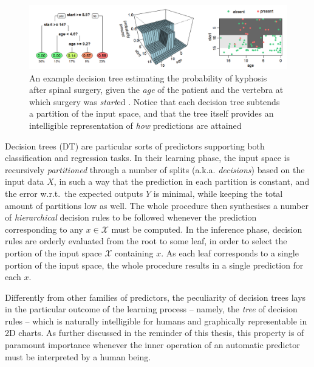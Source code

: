 \documentclass[12pt,a4paper,openright,twoside]{book}
\begin{document}
\begin{figure}
    \centering
    \includegraphics[width=\linewidth]{figures/dt-kyphosis.png}
    \caption[An example decision tree estimating the probability of kyphosis after spinal surgery]{An example decision tree estimating the probability of kyphosis after spinal surgery, given the \emph{age} of the patient and the vertebra at which surgery was \emph{start}ed \cite{wiki:dt-learning}. Notice that each decision tree subtends a partition of the input space, and that the tree itself provides an intelligible representation of \emph{how} predictions are attained}
    \label{fig:dt-example}
\end{figure}

Decision trees (DT) are particular sorts of predictors supporting both classification and regression tasks.
%
In their learning phase, the input space is recursively \emph{partitioned} through a number of splits (a.k.a. \emph{decisions}) based on the input data $X$, in such a way that the prediction in each partition is constant, and the error w.r.t.\ the expected outputs $Y$ is minimal, while keeping the total amount of partitions low as well.
%
The whole procedure then synthesises a number of \emph{hierarchical} decision rules to be followed whenever the prediction corresponding to any $x \in \mathcal{X}$ must be computed.
%
In the inference phase, decision rules are orderly evaluated from the root to some leaf, in order to select the portion of the input space  $\mathcal{X}$ containing $x$.
%
As each leaf corresponds to a single portion of the input space, the whole procedure results in a single prediction for each $x$.

Differently from other families of predictors, the peculiarity of decision trees lays in the particular outcome of the learning process -- namely, the \emph{tree} of decision rules -- which is naturally intelligible for humans and graphically representable in 2D charts.
%
As further discussed in the reminder of this thesis, this property is of paramount importance whenever the inner operation of an automatic predictor must be interpreted by a human being.
\end{document}
